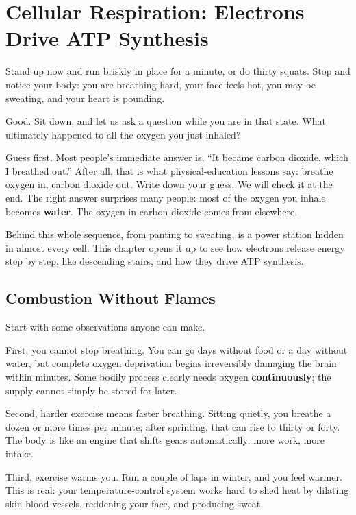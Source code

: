 \chapter{Cellular Respiration: Electrons Drive ATP Synthesis}

\begin{kaichang}
Stand up now and run briskly in place for a minute, or do thirty squats. Stop and notice your body: you are breathing hard, your face feels hot, you may be sweating, and your heart is pounding.

Good. Sit down, and let us ask a question while you are in that state. What ultimately happened to all the oxygen you just inhaled?

Guess first. Most people's immediate answer is, ``It became carbon dioxide, which I breathed out.'' After all, that is what physical-education lessons say: breathe oxygen in, carbon dioxide out. Write down your guess. We will check it at the end. The right answer surprises many people: most of the oxygen you inhale becomes \textbf{water}. The oxygen in carbon dioxide comes from elsewhere.

Behind this whole sequence, from panting to sweating, is a power station hidden in almost every cell. This chapter opens it up to see how electrons release energy step by step, like descending stairs, and how they drive ATP synthesis.
\end{kaichang}

\section{Combustion Without Flames}

Start with some observations anyone can make.

First, you cannot stop breathing. You can go days without food or a day without water, but complete oxygen deprivation begins irreversibly damaging the brain within minutes. Some bodily process clearly needs oxygen \textbf{continuously}; the supply cannot simply be stored for later.

Second, harder exercise means faster breathing. Sitting quietly, you breathe a dozen or more times per minute; after sprinting, that can rise to thirty or forty. The body is like an engine that shifts gears automatically: more work, more intake.

Third, exercise warms you. Run a couple of laps in winter, and you feel warmer. This is real: your temperature-control system works hard to shed heat by dilating skin blood vessels, reddening your face, and producing sweat.

